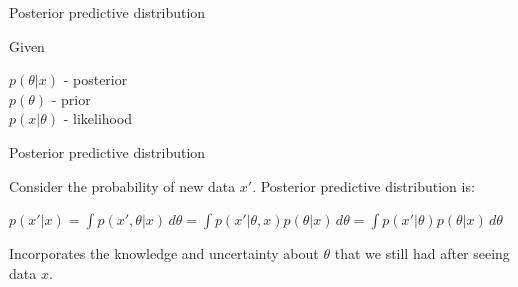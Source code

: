 \documentclass[10pt]{beamer}
\begin{document}
\begin{frame}{Posterior predictive distribution}

\begin{sblock}{Given}

$p(\theta | x)$ - posterior \\
$p(\theta)$ - prior \\
$p(x | \theta)$ - likelihood

\end{sblock}

\begin{sblock}{Posterior predictive distribution}

Consider the probability of new data $x'$. Posterior predictive distribution is:

$p(x' | x) = \int p(x', \theta | x) \, d\theta = \int p(x' | \theta, x) p(\theta |x) \, d\theta = \int p(x' | \theta) p(\theta | x) \, d\theta$

Incorporates the knowledge and uncertainty about $\theta$ that we still had after seeing data $x$.

\end{sblock}

\end{frame}
\end{document}
